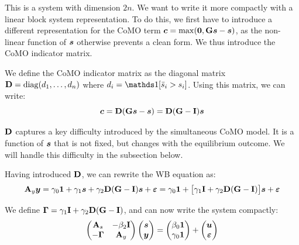 This is a system with dimension $2n$. We want to write it more compactly with a linear block system representation. To do this, we first have to introduce a different representation for the CoMO term $\bm{c} = \max(\bm{0}, \mathbf{G}\bm{s} - \bm{s})$, as the non-linear function of $\bm{s}$ otherwise prevents a clean form. We thus introduce the CoMO indicator matrix.

\begin{definition}
\label{def:como_indicator}
We define the CoMO indicator matrix as the diagonal matrix $\mathbf{D} = \operatorname{diag}(d_1, \ldots, d_n)$ where $d_i = \one[\sbar_i > s_i]$. Using this matrix, we can write:
\begin{equation}
    \bm{c} = \mathbf{D}(\mathbf{G}\bm{s} - \bm{s}) = \mathbf{D}(\mathbf{G} - \mathbf{I})\bm{s}
\end{equation}
\end{definition}

$\mathbf{D}$ captures a key difficulty introduced by the simultaneous CoMO model. It is a function of $\bm{s}$ that is not fixed, but changes with the equilibrium outcome. We will handle this difficulty in the subsection below.

Having introduced $\mathbf{D}$, we can rewrite the WB equation as:
\begin{equation}
    \mathbf{A}_y\bm{y} = \gamma_0\bm{1} + \gamma_1\bm{s} + \gamma_2\mathbf{D}(\mathbf{G} - \mathbf{I})\bm{s} + \bm{\varepsilon}
    = \gamma_0\bm{1} + \bigl[\gamma_1\mathbf{I} + \gamma_2\mathbf{D}(\mathbf{G} - \mathbf{I})\bigr]\bm{s} + \bm{\varepsilon}
\end{equation}

We define $\mathbf{\Gamma} = \gamma_1\mathbf{I} + \gamma_2\mathbf{D}(\mathbf{G} - \mathbf{I})$, and can now write the system compactly:
\begin{equation}
\label{eq:simul_block}
    \begin{pmatrix}
        \mathbf{A}_s & -\beta_2\mathbf{I} \\
        -\mathbf{\Gamma} & \mathbf{A}_y
    \end{pmatrix}
    \begin{pmatrix}
        \bm{s} \\ \bm{y}
    \end{pmatrix}
    =
    \begin{pmatrix}
        \beta_0\bm{1} \\ \gamma_0\bm{1}
    \end{pmatrix}
    +
    \begin{pmatrix}
        \bm{u} \\ \bm{\varepsilon}
    \end{pmatrix}
\end{equation}


